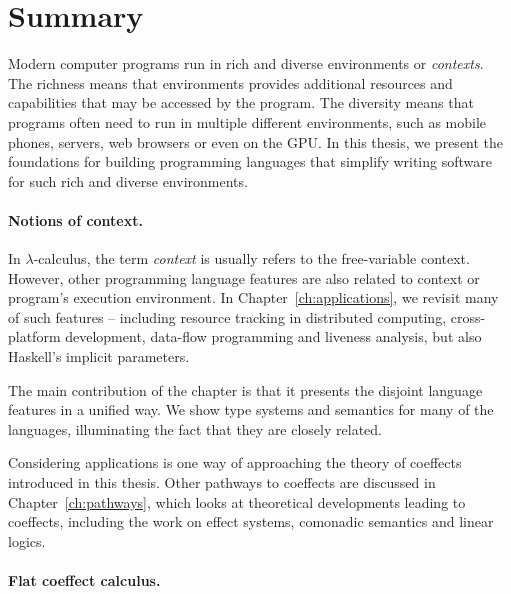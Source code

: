 \section{Summary}
\label{sec:conc-summary}

Modern computer programs run in rich and diverse environments or \emph{contexts}. The richness means
that environments provides additional resources and capabilities that may be accessed by the program.
The diversity means that programs often need to run in multiple different environments, such as mobile
phones, servers, web browsers or even on the GPU. In this thesis, we present the foundations for
building programming languages that simplify writing software for such rich and diverse environments.


\paragraph{Notions of context.}

In $\lambda$-calculus, the term \emph{context} is usually refers to the free-variable context.
However, other programming language features are also related to context or program's
execution environment. In Chapter~\ref{ch:applications}, we revisit many of such features --
including resource tracking in distributed computing, cross-platform development, data-flow
programming and liveness analysis, but also Haskell's implicit parameters.

The main contribution of the chapter is that it presents the disjoint language features in a
unified way. We show type systems and semantics for many of the languages, illuminating
the fact that they are closely related.

Considering applications is one way of approaching the theory of coeffects introduced in this thesis.
Other pathways to coeffects are discussed in Chapter~\ref{ch:pathways}, which looks at theoretical
developments leading to coeffects, including the work on effect systems, comonadic semantics and
linear logics.


\paragraph{Flat coeffect calculus.}

